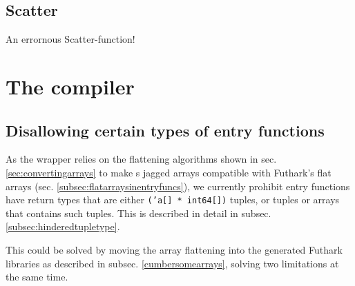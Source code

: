 \subsection{Scatter}
\label{subsec:badscatter}

An errornous Scatter-function!

\section{The \fshark{} compiler}

\subsection{Disallowing certain types of \fshark{} entry functions}
As the \fshark{} wrapper relies on the flattening algorithms shown in sec.
\ref{sec:convertingarrays} to make \fsharp{}s jagged arrays compatible with
Futhark's flat arrays (sec. \ref{subsec:flatarraysinentryfuncs}), we currently
prohibit \fshark{} entry functions have return types that are either
\texttt{('a[] * int64[])} tuples, or tuples or arrays that contains such
tuples. This is described in detail in subsec. \ref{subsec:hinderedtupletype}.

This could be solved by moving the array flattening into the generated Futhark
\csharp{} libraries as described in subsec. \ref{cumbersomearrays}, solving two
limitations at the same time.


